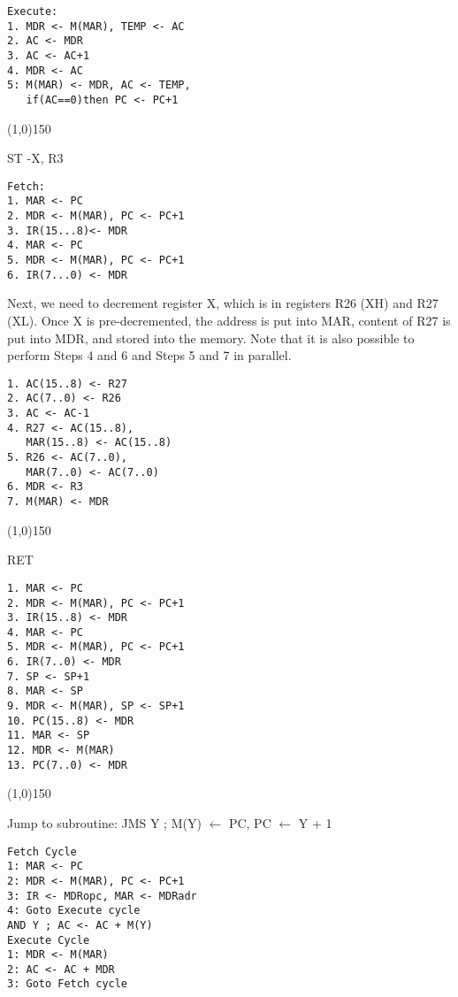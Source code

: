 \documentclass[8pt]{article}
\begin{document}
\begin{multicols}{3}
\begin{verbatim}
Execute: 
1. MDR <- M(MAR), TEMP <- AC
2. AC <- MDR
3. AC <- AC+1
4. MDR <- AC
5: M(MAR) <- MDR, AC <- TEMP, 
   if(AC==0)then PC <- PC+1

\end{verbatim}

\line(1,0){150}

ST -X, R3

\begin{verbatim}
Fetch: 
1. MAR <- PC
2. MDR <- M(MAR), PC <- PC+1
3. IR(15...8)<- MDR
4. MAR <- PC
5. MDR <- M(MAR), PC <- PC+1
6. IR(7...0) <- MDR
\end{verbatim}

Next, we need to decrement register X, which is in registers R26 (XH) and R27
(XL). Once X is pre-decremented, the address is put into MAR, content of R27
is put into MDR, and stored into the memory. Note that it is also possible to
perform Steps 4 and 6 and Steps 5 and 7 in parallel. 

\begin{verbatim}
1. AC(15..8) <- R27
2. AC(7..0) <- R26
3. AC <- AC-1
4. R27 <- AC(15..8), 
   MAR(15..8) <- AC(15..8)
5. R26 <- AC(7..0), 
   MAR(7..0) <- AC(7..0)
6. MDR <- R3
7. M(MAR) <- MDR
\end{verbatim}

\line(1,0){150}

RET

\begin{verbatim}
1. MAR <- PC
2. MDR <- M(MAR), PC <- PC+1
3. IR(15..8) <- MDR
4. MAR <- PC
5. MDR <- M(MAR), PC <- PC+1
6. IR(7..0) <- MDR
7. SP <- SP+1
8. MAR <- SP
9. MDR <- M(MAR), SP <- SP+1
10. PC(15..8) <- MDR
11. MAR <- SP
12. MDR <- M(MAR)
13. PC(7..0) <- MDR
\end{verbatim}

\line(1,0){150}

Jump to subroutine: JMS Y ; M(Y) $\leftarrow$ PC, PC $\leftarrow$ Y + 1

\begin{verbatim}
Fetch Cycle
1: MAR <- PC
2: MDR <- M(MAR), PC <- PC+1
3: IR <- MDRopc, MAR <- MDRadr
4: Goto Execute cycle
AND Y ; AC <- AC + M(Y)
Execute Cycle
1: MDR <- M(MAR)
2: AC <- AC + MDR
3: Goto Fetch cycle
\end{verbatim}



\end{multicols}
\end{document}
